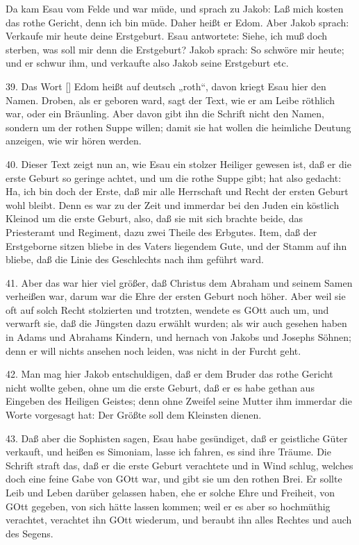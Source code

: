 Da kam Esau vom Felde und war müde, und sprach zu Jakob: Laß mich kosten das rothe Gericht, denn ich bin müde. Daher heißt er Edom. Aber Jakob sprach: Verkaufe mir heute deine Erstgeburt. Esau antwortete: Siehe, ich muß doch sterben, was soll mir denn die Erstgeburt? Jakob sprach: So schwöre mir heute; und er schwur ihm, und verkaufte also Jakob seine Erstgeburt etc.

39. Das Wort [] Edom heißt auf deutsch „roth“, davon kriegt Esau hier den Namen. Droben, als er geboren ward, sagt der Text, wie er am Leibe röthlich war, oder ein Bräunling. Aber davon gibt ihn die Schrift nicht den Namen, sondern um der rothen Suppe willen; damit sie hat wollen die heimliche Deutung anzeigen, wie wir hören werden.

40. Dieser Text zeigt nun an, wie Esau ein stolzer Heiliger gewesen ist, daß er die erste Geburt so geringe achtet, und um die rothe Suppe gibt; hat also gedacht: Ha, ich bin doch der Erste, daß mir alle Herrschaft und Recht der ersten Geburt wohl bleibt. Denn es war zu der Zeit und immerdar bei den Juden ein köstlich Kleinod um die erste Geburt, also, daß sie mit sich brachte beide, das Priesteramt und Regiment, dazu zwei Theile des Erbgutes. Item, daß der Erstgeborne sitzen bliebe in des Vaters liegendem Gute, und der Stamm auf ihn bliebe, daß die Linie des Geschlechts nach ihm geführt ward.

41. Aber das war hier viel größer, daß Christus dem Abraham und seinem Samen verheißen war, darum war die Ehre der ersten Geburt noch höher. Aber weil sie oft auf solch Recht stolzierten und trotzten, wendete es GOtt auch um, und verwarft sie, daß die Jüngsten dazu erwählt wurden; als wir auch gesehen haben in Adams und Abrahams Kindern, und hernach von Jakobs und Josephs Söhnen; denn er will
nichts ansehen noch leiden, was nicht in der Furcht geht.

42. Man mag hier Jakob entschuldigen, daß er dem Bruder das rothe Gericht nicht wollte geben, ohne um die erste Geburt, daß er es habe gethan aus Eingeben des Heiligen Geistes; denn ohne Zweifel seine Mutter ihm immerdar die Worte vorgesagt hat: Der Größte soll dem Kleinsten dienen.

43. Daß aber die Sophisten sagen, Esau habe gesündiget, daß er geistliche Güter verkauft, und heißen es Simoniam, lasse ich fahren, es sind ihre Träume. Die Schrift straft das, daß er die erste Geburt verachtete und in Wind schlug, welches doch eine feine Gabe von GOtt war, und gibt sie um den rothen Brei. Er sollte Leib und Leben darüber gelassen haben, ehe er solche Ehre und Freiheit, von GOtt gegeben, von sich hätte lassen kommen; weil er es aber so hochmüthig verachtet, verachtet ihn GOtt wiederum, und beraubt ihn alles Rechtes und auch des Segens.

